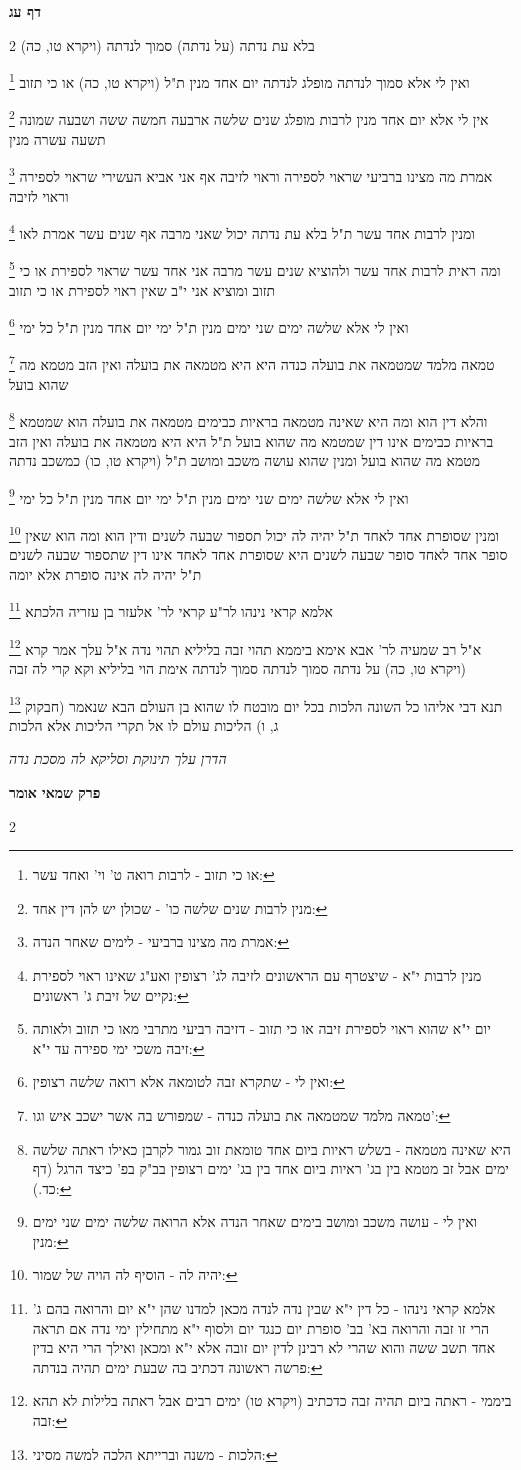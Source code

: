 \documentclass[12pt, openany]{book}
\newcommand{\sethebfont}{
\fontsize{10.5pt}{21.0pt} \selectfont
}
\newcommand{\twocol}[1]{
	{\sethebfont \begin{multicols}{2}
			#1
	\end{multicols}}	
}
\newcommand{\chapname}{}
\newcommand{\sectname}{}
\newcommand{\newchap}[1]{
	\addcontentsline{toc}{chapter}{#1}
	\renewcommand{\chapname}{#1}
		\begin{center}
			\textbf{%
\fontsize{16pt}{16pt}\selectfont
				#1}
		\end{center}
}
\newcommand{\newsection}[1]{
	\renewcommand{\sectname}{#1}	
	\vspace{-\baselineskip}
	\begin{center}
		\textbf{%
\fontsize{16pt}{16pt}\selectfont
			#1}
	\end{center}
	\vspace{-\baselineskip}
	\nopagebreak
}
\newcommand{\footnotecomment}[1]{
	\renewcommand\thefootnote{}
	\footnote{#1}}
\newcommand{\commenta}[1]{\footnotecomment{#1}}
\begin{document}
\newsection{דף עג}
\twocol{(ויקרא טו, כה) בלא עת נדתה (על נדתה) סמוך לנדתה 
\commenta{או כי תזוב - לרבות רואה ט' וי' ואחד עשר:}
ואין לי אלא סמוך לנדתה מופלג לנדתה יום אחד מנין ת"ל (ויקרא טו, כה) או כי תזוב 
\commenta{מנין לרבות שנים שלשה כו' - שכולן יש להן דין אחד:}
אין לי אלא יום אחד מנין לרבות מופלג שנים שלשה ארבעה חמשה ששה ושבעה שמונה תשעה עשרה מנין 
\commenta{אמרת מה מצינו ברביעי - לימים שאחר הנדה:}
אמרת מה מצינו ברביעי שראוי לספירה וראוי לזיבה אף אני אביא העשירי שראוי לספירה וראוי לזיבה 
\commenta{מנין לרבות י"א - שיצטרף עם הראשונים לזיבה לג' רצופין ואע"ג שאינו ראוי לספירת נקיים של זיבת ג' ראשונים:}
ומנין לרבות אחד עשר ת"ל בלא עת נדתה יכול שאני מרבה אף שנים עשר אמרת לאו 
\commenta{יום י"א שהוא ראוי לספירת זיבה או כי תזוב - דזיבה רביעי מתרבי מאו כי תזוב ולאותה זיבה משכי ימי ספירה עד י"א: }
ומה ראית לרבות אחד עשר ולהוציא שנים עשר מרבה אני אחד עשר שראוי לספירת או כי תזוב ומוציא אני י"ב שאין ראוי לספירת או כי תזוב 
\commenta{ואין לי - שתקרא זבה לטומאה אלא רואה שלשה רצופין:}
ואין לי אלא שלשה ימים שני ימים מנין ת"ל ימי יום אחד מנין ת"ל כל ימי
\commenta{טמאה מלמד שמטמאה את בועלה כנדה - שמפורש בה אשר ישכב איש וגו':}
טמאה מלמד שמטמאה את בועלה כנדה היא היא מטמאה את בועלה ואין הזב מטמא מה שהוא בועל 
\commenta{היא שאינה מטמאה - בשלש ראיות ביום אחד טומאת זוב גמור לקרבן כאילו ראתה שלשה ימים אבל זב מטמא בין בג' ראיות ביום אחד בין בג' ימים רצופין בב"ק בפ' כיצד הרגל (דף כד.):}
והלא דין הוא ומה היא שאינה מטמאה בראיות כבימים מטמאה את בועלה הוא שמטמא בראיות כבימים אינו דין שמטמא מה שהוא בועל ת"ל היא היא מטמאה את בועלה ואין הזב מטמא מה שהוא בועל 
ומנין שהוא עושה משכב ומושב ת"ל (ויקרא טו, כו) כמשכב נדתה 
\commenta{ואין לי - עושה משכב ומושב בימים שאחר הנדה אלא הרואה שלשה ימים שני ימים מנין:}
ואין לי אלא שלשה ימים שני ימים מנין ת"ל ימי יום אחד מנין ת"ל כל ימי 
\commenta{יהיה לה - הוסיף לה הויה של שמור:}
ומנין שסופרת אחד לאחד ת"ל יהיה לה יכול תספור שבעה לשנים ודין הוא ומה הוא שאין סופר אחד לאחד סופר שבעה לשנים היא שסופרת אחד לאחד אינו דין שתספור שבעה לשנים ת"ל יהיה לה אינה סופרת אלא יומה
\commenta{אלמא קראי נינהו - כל דין י"א שבין נדה לנדה מכאן למדנו שהן י"א יום והרואה בהם ג' הרי זו זבה והרואה בא' בב' סופרת יום כנגד יום ולסוף י"א מתחילין ימי נדה אם תראה אחד תשב ששה והוא שהרי לא רבינן לדין יום זובה אלא י"א ומכאן ואילך הרי היא בדין פרשה ראשונה דכתיב בה שבעת ימים תהיה בנדתה:}
אלמא קראי נינהו לר"ע קראי לר' אלעזר בן עזריה הלכתא 
\commenta{ביממי - ראתה ביום תהיה זבה כדכתיב (ויקרא טו) ימים רבים אבל ראתה בלילות לא תהא זבה:}
א"ל רב שמעיה לר' אבא אימא ביממא תהוי זבה בליליא תהוי נדה א"ל עלך אמר קרא (ויקרא טו, כה) על נדתה סמוך לנדתה סמוך לנדתה אימת הוי בליליא וקא קרי לה זבה 
\commenta{הלכות - משנה וברייתא הלכה למשה מסיני:}
תנא דבי אליהו כל השונה הלכות בכל יום מובטח לו שהוא בן העולם הבא שנאמר (חבקוק ג, ו) הליכות עולם לו אל תקרי הליכות אלא הלכות
\par \par {\large\emph{הדרן עלך תינוקת וסליקא לה מסכת נדה}}\par \par 
}
\newchap{פרק  שמאי אומר}
\twocol{\clearpage}
\end{document}
